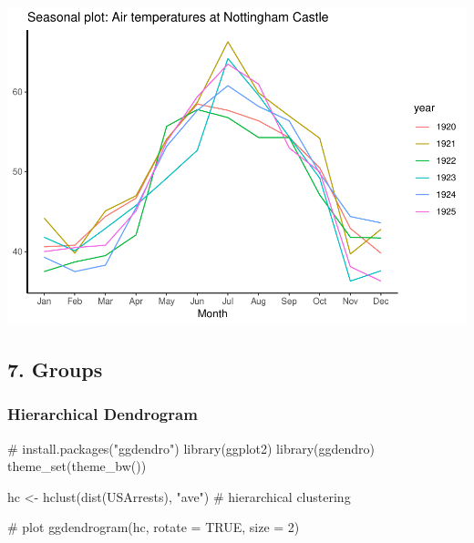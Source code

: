 \documentclass[a4paper]{article}
\newenvironment{Shaded}{}{}
\newcommand{\KeywordTok}[1]{\textcolor[rgb]{0.00,0.00,1.00}{#1}}
\newcommand{\DataTypeTok}[1]{#1}
\newcommand{\DecValTok}[1]{#1}
\newcommand{\StringTok}[1]{\textcolor[rgb]{0.00,0.50,0.50}{#1}}
\newcommand{\CommentTok}[1]{\textcolor[rgb]{0.00,0.50,0.00}{#1}}
\newcommand{\OtherTok}[1]{\textcolor[rgb]{1.00,0.25,0.00}{#1}}
\newcommand{\NormalTok}[1]{#1}
\begin{document}
\includegraphics{M24-ggplot2_Gallery_files/figure-latex/unnamed-chunk-53-1.pdf}

\newpage

\subsection{7. Groups}\label{groups}

\subsubsection{Hierarchical Dendrogram}\label{hierarchical-dendrogram}

\begin{Shaded}
\begin{Highlighting}[]
\CommentTok{# install.packages("ggdendro")}
\KeywordTok{library}\NormalTok{(ggplot2)}
\KeywordTok{library}\NormalTok{(ggdendro)}
\KeywordTok{theme_set}\NormalTok{(}\KeywordTok{theme_bw}\NormalTok{())}

\NormalTok{hc <-}\StringTok{ }\KeywordTok{hclust}\NormalTok{(}\KeywordTok{dist}\NormalTok{(USArrests), }\StringTok{"ave"}\NormalTok{)  }\CommentTok{# hierarchical clustering}

\CommentTok{# plot}
\KeywordTok{ggdendrogram}\NormalTok{(hc, }\DataTypeTok{rotate =} \OtherTok{TRUE}\NormalTok{, }\DataTypeTok{size =} \DecValTok{2}\NormalTok{)}
\end{Highlighting}
\end{Shaded}
\end{document}
